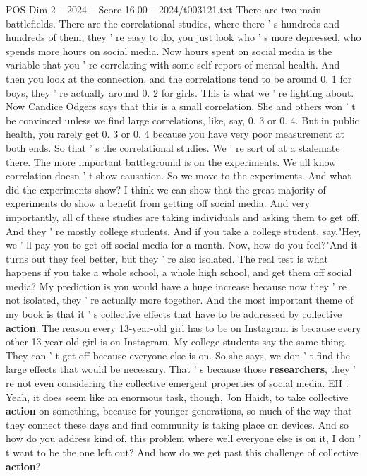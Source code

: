 \begin{textsample}{POS Dim 2 – 2024 – Score 16.00 – 2024/t003121.txt}
There are two main battlefields.
There are the correlational studies, where there ' s hundreds and hundreds of them, they ' re easy to do, you just look who ' s more depressed, who spends more hours on social media.
Now hours spent on social media is the variable that you ' re correlating with some self-report of mental health.
And then you look at the connection, and the correlations tend to be around 0. 1 for boys, they ' re actually around 0. 2 for girls.
This is what we ' re fighting about.
Now Candice Odgers says that this is a small correlation.
She and others won ' t be convinced unless we find large correlations, like, say, 0. 3 or 0. 4.
But in public health, you rarely get 0. 3 or 0. 4 because you have very poor measurement at both ends.
So that ' s the correlational studies.
We ' re sort of at a stalemate there.
The more important battleground is on the experiments.
We all know correlation doesn ' t show causation.
So we move to the experiments.
And what did the experiments show?
I think we can show that the great majority of experiments do show a benefit from getting off social media.
And very importantly, all of these studies are taking individuals and asking them to get off.
And they ' re mostly college students.
And if you take a college student, say,"Hey, we ' ll pay you to get off social media for a month.
Now, how do you feel?"And it turns out they feel better, but they ' re also isolated.
The real test is what happens if you take a whole school, a whole high school, and get them off social media?
My prediction is you would have a huge increase because now they ' re not isolated, they ' re actually more together.
And the most important theme of my book is that it ' s collective effects that have to be addressed by collective \textbf{action}.
The reason every 13-year-old girl has to be on Instagram is because every other 13-year-old girl is on Instagram.
My college students say the same thing.
They can ' t get off because everyone else is on.
So she says, we don ' t find the large effects that would be necessary.
That ' s because those \textbf{researchers}, they ' re not even considering the collective emergent properties of social media.
EH : Yeah, it does seem like an enormous task, though, Jon Haidt, to take collective \textbf{action} on something, because for younger generations, so much of the way that they connect these days and find community is taking place on devices.
And so how do you address kind of, this problem where well everyone else is on it, I don ' t want to be the one left out?
And how do we get past this challenge of collective \textbf{action}?

\end{textsample}
